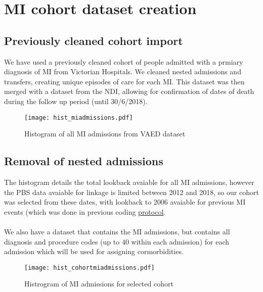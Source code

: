 \documentclass[11pt]{article}
\begin{document}
\pagebreak
		
\section{MI cohort dataset creation}
\subsection{Previously cleaned cohort import}
We have used a previously cleaned cohort of people admitted with a prmiary diagnosis of MI from Victorian Hospitals. We cleaned nested admissions and transfers, creating unique episodes of care for each MI. This dataset was then merged with a dataset from the NDI, allowing for confirmation of dates of death during the follow up period (until 30/6/2018). 

\color{violet}
\begin{stlog}\end{stlog}
\color{black}
\begin{figure} [h]
	\centering
	\texttt{[image: hist\_miadmissions.pdf]}
	\caption{Histogram of all MI admissions from VAED dataset}
	\label{hist_miadmissions}
\end{figure}

\subsection{Removal of nested admissions}
\color{violet}
\color{black}
The histogram details the total lookback avaiable for all MI admissions, however the PBS data avaiable for linkage is limited between 2012 and 2018, so our cohort was selected from these dates, with lookback to 2006 avaiable for previous MI events (which was done in previous coding \color{blue} \href{https://github.com/cardiopharmnerd/medsremote}{protocol}. \\~\\
\color{black} We also have a dataset that contains the MI admissions, but contains all diagnosis and procedure codes (up to 40 within each admission) for each admission which will be used for assigning cormorbidities. 
\color{violet}
\begin{stlog}\end{stlog}
\color{black}
\begin{figure} [h]
	\centering
	\texttt{[image: hist\_cohortmiadmissions.pdf]}
	\caption{Histrogram of MI admissions for selected cohort}
	\label{hist_cohortmiadmissions}
\end{figure}
\end{document}
